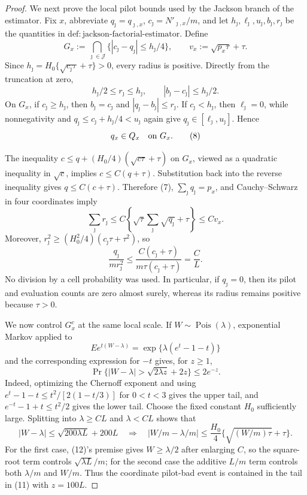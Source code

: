 \documentclass{article}
\begin{document}
\begin{proof}
We next prove the local pilot bounds used by the Jackson branch of the estimator.  Fix \(x\), abbreviate \(q_\jmath=q_{\jmath,x}\), \(c_\jmath=N'_{\jmath,x}/m\), and let \(h_\jmath,\ell_\jmath,u_\jmath,b_\jmath,r_\jmath\) be the quantities in \(\mathrm{def:jackson\mbox{-}factorial\mbox{-}estimator}\).  Define
\[
 G_x:=\bigcap_{\jmath\in\mathcal J}
 \{|c_\jmath-q_\jmath|\leq h_\jmath/4\},
 \qquad
 v_x:=\sqrt{p_x\tau}+\tau.                                       \tag{6}
\]
Since \(h_\jmath=H_0\{\sqrt{c_\jmath\tau}+\tau\}>0\), every radius is positive.  Directly from the truncation at zero,
\[
 h_\jmath/2\leq r_\jmath\leq h_\jmath,
 \qquad |b_\jmath-c_\jmath|\leq h_\jmath/2.                     \tag{7}
\]
On \(G_x\), if \(c_\jmath\geq h_\jmath\), then \(b_\jmath=c_\jmath\) and \(|q_\jmath-b_\jmath|\leq r_\jmath\).  If \(c_\jmath<h_\jmath\), then \(\ell_\jmath=0\), while nonnegativity and \(q_\jmath\leq c_\jmath+h_\jmath/4<u_\jmath\) again give \(q_\jmath\in[\ell_\jmath,u_\jmath]\).  Hence
\[
 q_x\in Q_x\quad\hbox{on }G_x.                                  \tag{8}
\]

The inequality \(c\leq q+(H_0/4)(\sqrt{c\tau}+\tau)\) on \(G_x\), viewed as a quadratic inequality in \(\sqrt c\), implies \(c\leq C(q+\tau)\).  Substitution back into the reverse inequality gives \(q\leq C(c+\tau)\).  Therefore (7), \(\sum_\jmath q_\jmath=p_x\), and Cauchy--Schwarz in four coordinates imply
\[
 \sum_\jmath r_\jmath
 \leq C\left\{\sqrt{\tau}\sum_\jmath\sqrt{q_\jmath}+\tau\right\}
 \leq C v_x.                                                       \tag{9}
\]
Moreover, \(r_\jmath^2\geq(H_0^2/4)(c_\jmath\tau+\tau^2)\), so
\[
 \frac{q_\jmath}{m r_\jmath^2}
 \leq \frac{C(c_\jmath+\tau)}{m\tau(c_\jmath+\tau)}
 =\frac C L.                                                       \tag{10}
\]
No division by a cell probability was used.  In particular, if \(q_\jmath=0\), then its pilot and evaluation counts are zero almost surely, whereas its radius remains positive because \(\tau>0\).

We now control \(G_x^c\) at the same local scale.  If \(W\sim\operatorname{Pois}(\lambda)\), exponential Markov applied to
\[
 E e^{t(W-\lambda)}=\exp\{\lambda(e^t-1-t)\}
\]
and the corresponding expression for \(-t\) gives, for \(z\geq1\),
\[
 \Pr\{|W-\lambda|>\sqrt{2\lambda z}+2z\}\leq2e^{-z}.             \tag{11}
\]
Indeed, optimizing the Chernoff exponent and using \(e^t-1-t\leq t^2/[2(1-t/3)]\) for \(0<t<3\) gives the upper tail, and \(e^{-t}-1+t\leq t^2/2\) gives the lower tail.  Choose the fixed constant \(H_0\) sufficiently large.  Splitting into \(\lambda\geq C L\) and \(\lambda<C L\) shows that
\[
 |W-\lambda|\leq\sqrt{200\lambda L}+200L
 \quad\Longrightarrow\quad
 |W/m-\lambda/m|\leq\frac{H_0}{4}
 \{\sqrt{(W/m)\tau}+\tau\}.                                    \tag{12}
\]
For the first case, (12)'s premise gives \(W\geq\lambda/2\) after enlarging \(C\), so the square-root term controls \(\sqrt{\lambda L}/m\); for the second case the additive \(L/m\) term controls both \(\lambda/m\) and \(W/m\).  Thus the coordinate pilot-bad event is contained in the tail in (11) with \(z=100L\).


\end{proof}
\end{document}
